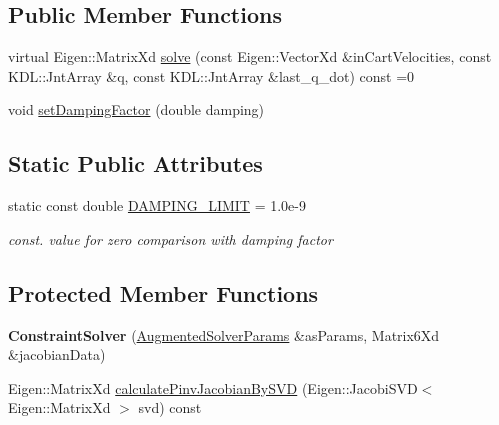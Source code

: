 \subsection*{Public Member Functions}
\begin{DoxyCompactItemize}
\item 
virtual Eigen\-::\-Matrix\-Xd \hyperlink{classConstraintSolver_a6208240cb2dc47fdd9adfc3a069408cd}{solve} (const Eigen\-::\-Vector\-Xd \&in\-Cart\-Velocities, const K\-D\-L\-::\-Jnt\-Array \&q, const K\-D\-L\-::\-Jnt\-Array \&last\-\_\-q\-\_\-dot) const =0
\item 
void \hyperlink{classConstraintSolver_aa28788d041bb495b0a2c94182e3a126f}{set\-Damping\-Factor} (double damping)
\end{DoxyCompactItemize}
\subsection*{Static Public Attributes}
\begin{DoxyCompactItemize}
\item 
\hypertarget{classConstraintSolver_a0dfdb039dd2a0c8b464410068e3b2ffb}{static const double \hyperlink{classConstraintSolver_a0dfdb039dd2a0c8b464410068e3b2ffb}{D\-A\-M\-P\-I\-N\-G\-\_\-\-L\-I\-M\-I\-T} = 1.\-0e-\/9}\label{classConstraintSolver_a0dfdb039dd2a0c8b464410068e3b2ffb}

\begin{DoxyCompactList}\small\item\em const. value for zero comparison with damping factor \end{DoxyCompactList}\end{DoxyCompactItemize}
\subsection*{Protected Member Functions}
\begin{DoxyCompactItemize}
\item 
\hypertarget{classConstraintSolver_adcb585a5c7f9e1c1d6fa1512e14a3213}{{\bfseries Constraint\-Solver} (\hyperlink{structAugmentedSolverParams}{Augmented\-Solver\-Params} \&as\-Params, Matrix6\-Xd \&jacobian\-Data)}\label{classConstraintSolver_adcb585a5c7f9e1c1d6fa1512e14a3213}

\item 
Eigen\-::\-Matrix\-Xd \hyperlink{classConstraintSolver_a015784de5861c9320991a3fd3523f232}{calculate\-Pinv\-Jacobian\-By\-S\-V\-D} (Eigen\-::\-Jacobi\-S\-V\-D$<$ Eigen\-::\-Matrix\-Xd $>$ svd) const 
\end{DoxyCompactItemize}
